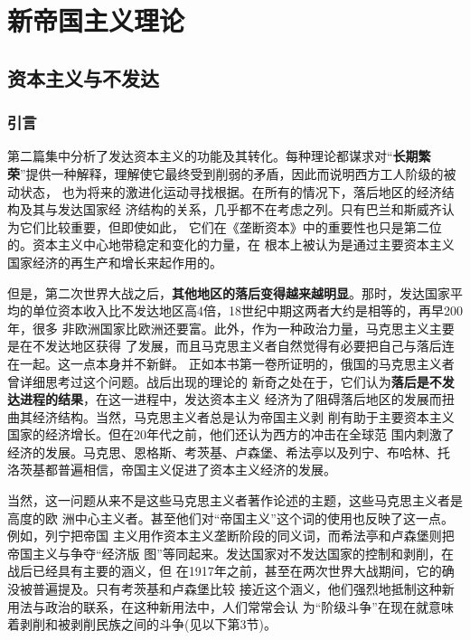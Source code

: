 \part{新帝国主义理论}

\chapter{资本主义与不发达}

\section{引言}

第二篇集中分析了发达资本主义的功能及其转化。每种理论都谋求对“\textbf{长期繁
  荣}”提供一种解释，理解使它最终受到削弱的矛盾，因此而说明西方工人阶级的被动状态，
也为将来的激进化运动寻找根据。在所有的情况下，落后地区的经济结构及其与发达国家经
济结构的关系，几乎都不在考虑之列。只有巴兰和斯威齐认为它们比较重要，但即使如此，
它们在《垄断资本》中的重要性也只是第二位的。资本主义中心地带稳定和变化的力量，在
根本上被认为是通过主要资本主义国家经济的再生产和增长来起作用的。

但是，第二次世界大战之后，\textbf{其他地区的落后变得越来越明显}。那时，发达国家平
均的单位资本收入比不发达地区高4倍，18世纪中期这两者大约是相等的，再早200年，很多
非欧洲国家比欧洲还要富。此外，作为一种政治力量，马克思主义主要是在不发达地区获得
了发展，而且马克思主义者自然觉得有必要把自己与落后连在一起。这一点本身并不新鲜。
正如本书第一卷所证明的，俄国的马克思主义者曾详细思考过这个问题。战后出现的理论的
新奇之处在于，它们认为\textbf{落后是不发达进程的结果}，在这一进程中，发达资本主义
经济为了阻碍落后地区的发展而扭曲其经济结构。当然，马克思主义者总是认为帝国主义剥
削有助于主要资本主义国家的经济增长。但在20年代之前，他们还认为西方的冲击在全球范
围内刺激了经济的发展。马克思、恩格斯、考茨基、卢森堡、希法亭以及列宁、布哈林、托
洛茨基都普遍相信，帝国主义促进了资本主义经济的发展。

当然，这一问题从来不是这些马克思主义者著作论述的主题，这些马克思主义者是高度的欧
洲中心主义者。甚至他们对“帝国主义”这个词的使用也反映了这一点。例如，列宁把帝国
主义用作资本主义垄断阶段的同义词，而希法亭和卢森堡则把帝国主义与争夺“经济版
图”等同起来。发达国家对不发达国家的控制和剥削，在战后已经具有主要的涵义，但
在1917年之前，甚至在两次世界大战期间，它的确没被普遍提及。只有考茨基和卢森堡比较
接近这个涵义，他们强烈地抵制这种新用法与政治的联系，在这种新用法中，人们常常会认
为“阶级斗争”在现在就意味着剥削和被剥削民族之间的斗争(见以下第3节)。

